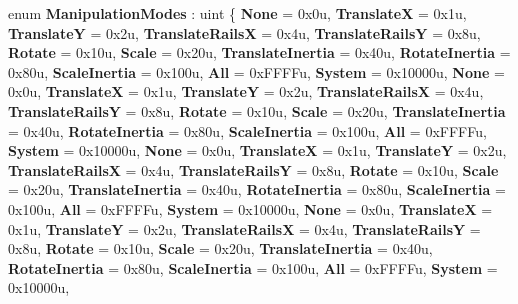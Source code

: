 \begin{DoxyCompactItemize}
\item 
\mbox{\label{namespace_windows_1_1_u_i_1_1_xaml_1_1_input_a8c481e845e38fcfb6aa19028f4362554}} 
enum {\bfseries Manipulation\+Modes} \+: uint \{ \newline
{\bfseries None} = 0x0u, 
{\bfseries TranslateX} = 0x1u, 
{\bfseries TranslateY} = 0x2u, 
{\bfseries Translate\+RailsX} = 0x4u, 
\newline
{\bfseries Translate\+RailsY} = 0x8u, 
{\bfseries Rotate} = 0x10u, 
{\bfseries Scale} = 0x20u, 
{\bfseries Translate\+Inertia} = 0x40u, 
\newline
{\bfseries Rotate\+Inertia} = 0x80u, 
{\bfseries Scale\+Inertia} = 0x100u, 
{\bfseries All} = 0x\+F\+F\+F\+Fu, 
{\bfseries System} = 0x10000u, 
\newline
{\bfseries None} = 0x0u, 
{\bfseries TranslateX} = 0x1u, 
{\bfseries TranslateY} = 0x2u, 
{\bfseries Translate\+RailsX} = 0x4u, 
\newline
{\bfseries Translate\+RailsY} = 0x8u, 
{\bfseries Rotate} = 0x10u, 
{\bfseries Scale} = 0x20u, 
{\bfseries Translate\+Inertia} = 0x40u, 
\newline
{\bfseries Rotate\+Inertia} = 0x80u, 
{\bfseries Scale\+Inertia} = 0x100u, 
{\bfseries All} = 0x\+F\+F\+F\+Fu, 
{\bfseries System} = 0x10000u, 
\newline
{\bfseries None} = 0x0u, 
{\bfseries TranslateX} = 0x1u, 
{\bfseries TranslateY} = 0x2u, 
{\bfseries Translate\+RailsX} = 0x4u, 
\newline
{\bfseries Translate\+RailsY} = 0x8u, 
{\bfseries Rotate} = 0x10u, 
{\bfseries Scale} = 0x20u, 
{\bfseries Translate\+Inertia} = 0x40u, 
\newline
{\bfseries Rotate\+Inertia} = 0x80u, 
{\bfseries Scale\+Inertia} = 0x100u, 
{\bfseries All} = 0x\+F\+F\+F\+Fu, 
{\bfseries System} = 0x10000u, 
\newline
{\bfseries None} = 0x0u, 
{\bfseries TranslateX} = 0x1u, 
{\bfseries TranslateY} = 0x2u, 
{\bfseries Translate\+RailsX} = 0x4u, 
\newline
{\bfseries Translate\+RailsY} = 0x8u, 
{\bfseries Rotate} = 0x10u, 
{\bfseries Scale} = 0x20u, 
{\bfseries Translate\+Inertia} = 0x40u, 
\newline
{\bfseries Rotate\+Inertia} = 0x80u, 
{\bfseries Scale\+Inertia} = 0x100u, 
{\bfseries All} = 0x\+F\+F\+F\+Fu, 
{\bfseries System} = 0x10000u, 
\newline

\end{DoxyCompactItemize}
